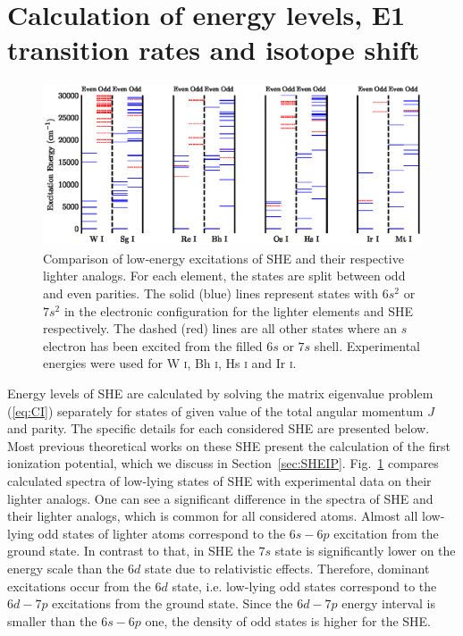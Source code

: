 \documentclass[8pt,a4paper, twoside]{report}
\begin{document}
\section{Calculation of energy levels, E1 transition rates and isotope shift} \label{sec:spectra}
\begin{landscape}
\begin{figure}
\center
\includegraphics[scale=1]{./figures/Sg_Mt_Energy_Plot.eps} 
\caption{Comparison of low-energy excitations of SHE and their respective lighter analogs. For each element, the states are split between odd and even parities. The solid (blue) lines represent states with $6s^2$ or $7s^2$ in the electronic configuration for the lighter elements and SHE respectively. The dashed (red) lines are all other states where an $s$ electron has been excited from the filled $6s$ or $7s$ shell. Experimental energies were used for W \textsc{i}, Bh \textsc{i}, Hs \textsc{i} and Ir \textsc{i}. \cite{NIST_ASD}\label{fig:EL}}
\end{figure}
\end{landscape}
Energy levels of SHE are calculated by solving the matrix eigenvalue problem (\ref{eq:CI}) separately for states of given value of the total angular momentum $J$ and parity. The specific details for each considered SHE are presented below. Most previous theoretical works on these SHE present the calculation of the first ionization potential, which we discuss in Section~\ref{sec:SHEIP}. Fig.~\ref{fig:EL} compares calculated spectra of low-lying states of SHE with experimental data on their lighter analogs. One can see a significant difference in the spectra of SHE and their lighter analogs, which is common for all considered atoms. Almost all low-lying odd states of lighter atoms correspond to the $6s-6p$ excitation from the ground state. In contrast to that, in SHE the $7s$ state is significantly lower on the energy scale than the $6d$ state due to relativistic effects. Therefore, dominant excitations occur from the $6d$ state, i.e. low-lying odd states correspond to the $6d-7p$ excitations from the ground state. Since the $6d-7p$ energy interval is smaller than the $6s-6p$ one, the density of odd states is higher for the SHE. 
\end{document}
